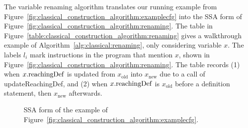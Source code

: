 {The variable renaming algorithm translates our running example from Figure~\ref{fig:classical_construction_algorithm:examplecfg} into the SSA form of Figure~\ref{fig:classical_construction_algorithm:renaming}. 
The table in Figure~\ref{table:classical_construction_algorithm:renaming} gives a walkthrough example of Algorithm~\ref{alg:classical:renaming}, only considering variable $x$. 
The labels $l_i$ mark instructions in the program that mention $x$, shown in Figure~\ref{fig:classical_construction_algorithm:renaming}. 
The table records (1) when $x.\mathrm{reachingDef}$ is updated from $x_\mathrm{old}$ into $x_\mathrm{new}$ due to a call of updateReachingDef, and (2) when $x.\mathrm{reachingDef}$ is $x_\mathrm{old}$ before a definition statement, then $x_\mathrm{new}$ afterwards.

\begin{figure}
\hfill
{}
\caption{SSA form of the example of 
Figure~\ref{fig:classical_construction_algorithm:examplecfg}.}
\end{figure}


}
